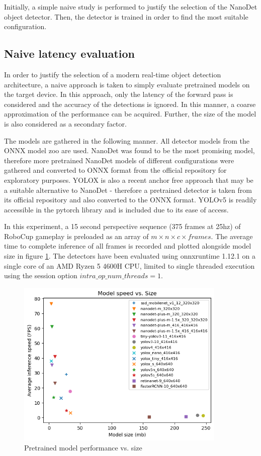 \documentclass[a4paper,twoside,12pt]{report}
\begin{document}
Initially, a simple naive study is performed to justify the selection of the NanoDet object detector. Then, the detector is trained in order to find the most suitable configuration.

\subsection{Naive latency evaluation}
In order to justify the selection of a modern real-time object detection architecture, a naive approach is taken to simply evaluate pretrained models on the target device. In this approach, only the latency of the forward pass is considered and the accuracy of the detections is ignored. In this manner, a coarse approximation of the performance can be acquired. Further, the size of the model is also considered as a secondary factor.

The models are gathered in the following manner. All detector models from the ONNX model zoo \cite{modelzoo} are used. NanoDet was found to be the most promising model, therefore more pretrained NanoDet models of different configurations were gathered and converted to ONNX format from the official repository for exploratory purposes. YOLOX \citep{yolox} is also a recent anchor free approach that may be a suitable alternative to NanoDet - therefore a pretrained detector is taken from its official repository \citep{yoloxrepo} and also converted to the ONNX format. YOLOv5 is readily accessible in the pytorch library and is included due to its ease of access. 

In this experiment, a 15 second perspective sequence (375 frames at 25hz) of RoboCup gameplay is preloaded as an array of $m \times n \times c \times frames$. The average time to complete inference of all frames is recorded and plotted alongside model size in figure \ref{fig:modelspeedsize}. The detectors have been evaluated using onnxruntime 1.12.1 on a single core of an AMD Ryzen 5 4600H CPU, limited to single threaded execution using the session option $intra\_op\_num\_threads = 1$. 

\begin{figure}[h!]
\begin{center}
\includegraphics[width=10cm]{images/modelspeedsize.png}
\caption{Pretrained model performance vs. size}
\label{fig:modelspeedsize}
\end{center}
\end{figure}
\end{document}
